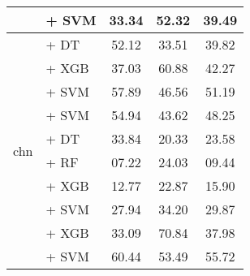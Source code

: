 \begin{sidewaystable}[h]
{\begin{tabular}{llccc}
                                               & \citep{nacar2025GATE} + SVM                                        & 33.34                                & 52.32              & 39.49             \\
            \midrule
            \multirow{12}{*}{chn}              & \citep{li2024conanembeddinggeneraltextembedding} + DT              & 52.12                                & 33.51              & 39.82             \\
                                               & \citep{li2024conanembeddinggeneraltextembedding} + XGB             & 37.03                                & 60.88              & 42.27             \\
                                               & \citep{li2024conanembeddinggeneraltextembedding} + SVM             & 57.89                                & 46.56              & 51.19             \\
                                               & \citep{wang2024multilingual} + SVM                                 & 54.94                                & 43.62              & 48.25             \\
                                               & \citep{zhang2024gme} + DT                                          & 33.84                                & 20.33              & 23.58             \\
                                               & \citep{zhang2024gme} + RF                                          & 07.22                                & 24.03              & 09.44             \\
                                               & \citep{zhang2024gme} + XGB                                         & 12.77                                & 22.87              & 15.90             \\
                                               & \citep{zhang2024gme} + SVM                                         & 27.94                                & 34.20              & 29.87             \\
                                               & \citep{lier0072023xiaobuembeddingv2} + XGB                         & 33.09                                & 70.84              & 37.98             \\
                                               & \citep{lier0072023xiaobuembeddingv2} + SVM                         & 60.44                                & 53.49              & 55.72             \\

\end{tabular}}
\end{sidewaystable}
